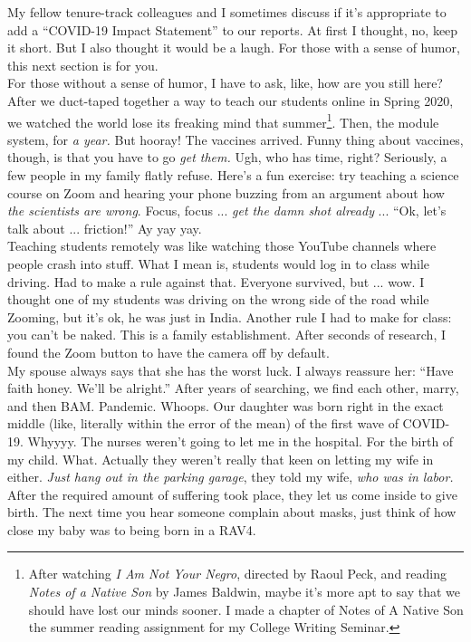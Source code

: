 \documentclass[../../main.tex]{subfiles}
\begin{document}
My fellow tenure-track colleagues and I sometimes discuss if it's appropriate to add a ``COVID-19 Impact Statement'' to our reports.  At first I thought, no, keep it short.  But I also thought it would be a laugh.  For those with a sense of humor, this next section is for you.  
\\
\vspace{0.15cm}
For those without a sense of humor, I have to ask, like, how are you still here?  After we duct-taped together a way to teach our students online in Spring 2020, we watched the world lose its freaking mind that summer\footnote{After watching \textit{I Am Not Your Negro}, directed by Raoul Peck, and reading \textit{Notes of a Native Son} by James Baldwin, maybe it's more apt to say that we should have lost our minds sooner. I made a chapter of Notes of A Native Son the summer reading assignment for my College Writing Seminar.}.  Then, the module system, for \textit{a year.}  But hooray!  The vaccines arrived.  Funny thing about vaccines, though, is that you have to go \textit{get them.}  Ugh, who has time, right?  Seriously, a few people in my family flatly refuse.  Here's a fun exercise: try teaching a science course on Zoom and hearing your phone buzzing from an argument about how \textit{the scientists are wrong}.  Focus, focus ... \textit{get the damn shot already} ... ``Ok, let's talk about ... friction!''  Ay yay yay.
\\
\vspace{0.15cm}
Teaching students remotely was like watching those YouTube channels where people crash into stuff.  What I mean is, students would log in to class while driving.  Had to make a rule against that.  Everyone survived, but ... wow.  I thought one of my students was driving on the wrong side of the road while Zooming, but it's ok, he was just in India.  Another rule I had to make for class: you can't be naked.  This is a family establishment. After seconds of research, I found the Zoom button to have the camera off by default.
\\
\vspace{0.15cm}
My spouse always says that she has the worst luck.  I always reassure her: ``Have faith honey.  We'll be alright.''  After years of searching, we find each other, marry, and then BAM.  Pandemic.  Whoops.  Our daughter was born right in the exact middle (like, literally within the error of the mean) of the first wave of COVID-19.  Whyyyy.  The nurses weren't going to let me in the hospital.  For the birth of my child.  What.  Actually they weren't really that keen on letting my wife in either.  \textit{Just hang out in the parking garage}, they told my wife, \textit{who was in labor.}  After the required amount of suffering took place, they let us come inside to give birth.  The next time you hear someone complain about masks, just think of how close my baby was to being born in a RAV4.
\end{document}
